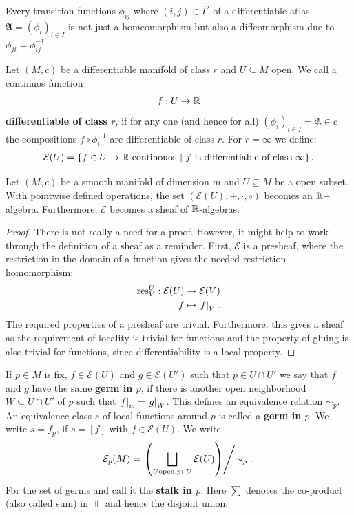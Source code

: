 \begin{corollary}
	Every transition functions $\phi_{ij}$ where $(i,j)\in I^2$ of a differentiable atlas $\mathfrak{A}=(\phi_i)_{i\in I}$ is not just a homeomorphism but also a diffeomorphism due to $\phi_{ji}=\phi_{ij}^{-1}$ 
\end{corollary}
\begin{definition}
	Let $(M,c)$ be a differentiable manifold of class $r$ and $U\subseteq M$ open. We call a continuos function 
	\begin{align*}
		f:U \to \mathbb{R}
	\end{align*} \textbf{differentiable of class $r$}, if for any one (and hence for all) $(\phi_i)_{i\in I}=\mathfrak{A}\in c$ the compositions $f\circ \phi_i^{-1}$ are differentiable of class $r$. For $r=\infty$ we define:
	\begin{align*}
		\mathcal{E}(U)=\{f\in U \to \mathbb{R} \text{ continouos}~|~ f \text{ is differentiable of class }\infty \} \, . 
	\end{align*}
\end{definition}
\begin{corollary}
	Let $(M,c)$ be a smooth manifold of dimension $m$ and $U\subseteq M$ be a open subset. With pointwise defined operations, the set $(\mathcal{E}(U),+,\cdot,\circ)$ becomes an $\mathbb{R}-$algebra. Furthermore, $\mathcal{E}$ becomes a sheaf of $\mathbb{R}$-algebras.
\end{corollary}
\begin{proof}
	There is not really a need for a proof. However, it might help to work through the definition of a sheaf as a reminder. First, $\mathcal{E}$ is a presheaf, where the restriction in the domain of a function gives the needed restriction homomorphism:
	\begin{align*}
		\text{res}^U_V: \mathcal{E}(U) &\to \mathcal{E}(V) \\
		f &\mapsto \left.f\right|_{V} \, .
	\end{align*} The required properties of a presheaf are trivial. Furthermore, this gives a sheaf as the requirement of locality is trivial for functions and the property of gluing is also trivial for functions, since differentiability is a local property.
\end{proof}
\begin{definition}
	If $p\in M$ is fix, $f\in \mathcal{E}(U)$ and $g\in \mathcal{E}(U')$ such that $p\in U\cap U'$ we say that $f$ and $g$ have the same \textbf{germ in $p$}, if there is another open neighborhood $W\subseteq U\cap U'$ of $p$ such that $\left.f\right|_{w}=\left.g\right|_{W}$. This defines an equivalence relation $\sim_p$. An equivalence class $s$ of local functions around $p$ is called a \textbf{germ in $p$}. We write $s=f_p$, if $s=[f]$ with $f\in \mathcal{E}(U)$. 
	We write 
	\begin{align*}
		\mathcal{E}_p(M)=\left. \left( \bigsqcup_{U \text{open},p\in U }\mathcal{E}(U)\right)\middle/ \sim_p \right. \, .
	\end{align*} For the set of germs and call it the \textbf{stalk in $p$}. Here $\sum$ denotes the co-product (also called sum)  in $\Top$ and hence the disjoint union.
\end{definition}
